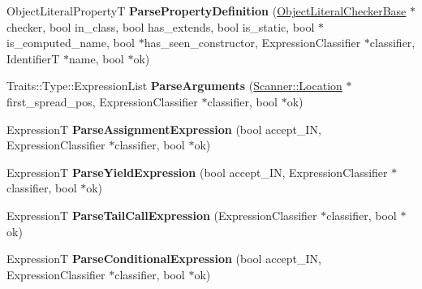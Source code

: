 \begin{DoxyCompactItemize}
\item 
Object\+Literal\+PropertyT {\bfseries Parse\+Property\+Definition} (\hyperlink{classv8_1_1internal_1_1_parser_base_1_1_object_literal_checker_base}{Object\+Literal\+Checker\+Base} $\ast$checker, bool in\+\_\+class, bool has\+\_\+extends, bool is\+\_\+static, bool $\ast$is\+\_\+computed\+\_\+name, bool $\ast$has\+\_\+seen\+\_\+constructor, Expression\+Classifier $\ast$classifier, IdentifierT $\ast$name, bool $\ast$ok)\hypertarget{classv8_1_1internal_1_1_parser_base_a29c4b9b68fc39d9f9f8767569079d55f}{}\label{classv8_1_1internal_1_1_parser_base_a29c4b9b68fc39d9f9f8767569079d55f}

\item 
Traits\+::\+Type\+::\+Expression\+List {\bfseries Parse\+Arguments} (\hyperlink{structv8_1_1internal_1_1_scanner_1_1_location}{Scanner\+::\+Location} $\ast$first\+\_\+spread\+\_\+pos, Expression\+Classifier $\ast$classifier, bool $\ast$ok)\hypertarget{classv8_1_1internal_1_1_parser_base_a0c549864a057718fced53e7a4702f7ab}{}\label{classv8_1_1internal_1_1_parser_base_a0c549864a057718fced53e7a4702f7ab}

\item 
ExpressionT {\bfseries Parse\+Assignment\+Expression} (bool accept\+\_\+\+IN, Expression\+Classifier $\ast$classifier, bool $\ast$ok)\hypertarget{classv8_1_1internal_1_1_parser_base_a83e46ee55f5ddeb568d9f575a875e1c9}{}\label{classv8_1_1internal_1_1_parser_base_a83e46ee55f5ddeb568d9f575a875e1c9}

\item 
ExpressionT {\bfseries Parse\+Yield\+Expression} (bool accept\+\_\+\+IN, Expression\+Classifier $\ast$classifier, bool $\ast$ok)\hypertarget{classv8_1_1internal_1_1_parser_base_aaef7f67f6c8585f6761ec9bcd4c61be3}{}\label{classv8_1_1internal_1_1_parser_base_aaef7f67f6c8585f6761ec9bcd4c61be3}

\item 
ExpressionT {\bfseries Parse\+Tail\+Call\+Expression} (Expression\+Classifier $\ast$classifier, bool $\ast$ok)\hypertarget{classv8_1_1internal_1_1_parser_base_af65c51d0c05f7ec5e11bedfdf2125494}{}\label{classv8_1_1internal_1_1_parser_base_af65c51d0c05f7ec5e11bedfdf2125494}

\item 
ExpressionT {\bfseries Parse\+Conditional\+Expression} (bool accept\+\_\+\+IN, Expression\+Classifier $\ast$classifier, bool $\ast$ok)\hypertarget{classv8_1_1internal_1_1_parser_base_ae9e07faa705a4a9209bac40958e797fa}{}\label{classv8_1_1internal_1_1_parser_base_ae9e07faa705a4a9209bac40958e797fa}


\end{DoxyCompactItemize}
